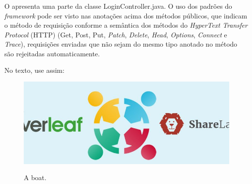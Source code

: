 O  apresenta uma parte da classe LoginController.java. O uso dos padrões do \textit{framework} pode ser visto nas anotações acima dos métodos públicos, que indicam o método de requisição conforme a semântica dos métodos do \textit{HyperText Transfer Protocol} (HTTP) (Get, Post, Put, \textit{Patch}, \textit{Delete}, \textit{Head}, \textit{Options}, \textit{Connect} e \textit{Trace}), requisições enviadas que não sejam do mesmo tipo anotado no método são rejeitadas automaticamente.






No texto, use assim:










\begin{figure}
	\caption{A boat.}
	\includegraphics[width=\linewidth]{2-textuais/figs/Overleaf-750x300.jpg}
	\label{fig:boat1}
\end{figure}

